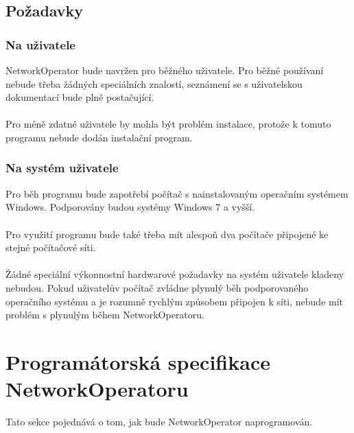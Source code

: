 \documentclass[12pt]{article}
\begin{document}
\subsection{Požadavky}
\subsubsection{Na uživatele}
NetworkOperator bude navržen pro běžného uživatele. Pro běžné používaní nebude třeba žádných speciálních znalostí, seznámení se s uživatelskou dokumentací bude plně postačující.\\\\
Pro méně zdatné uživatele by mohla být problém instalace, protože k tomuto programu nebude dodán instalační program.
\subsubsection{Na systém uživatele}
Pro běh programu bude zapotřebí počítač s nainstalovaným operačním systémem Windows. Podporovány budou systémy Windows 7 a vyšší.\\\\
Pro využití programu bude také třeba mít alespoň dva počítače připojené ke stejné počítačové síti.\\\\
Žádné speciální výkonnostní hardwarové požadavky na systém uživatele kladeny nebudou. Pokud uživatelův počítač zvládne plynulý běh podporovaného operačního systému a je rozumně rychlým způsobem připojen k síti, nebude mít problém s plynulým během NetworkOperatoru.

\section{Programátorská specifikace NetworkOperatoru}
Tato sekce pojednává o tom, jak bude NetworkOperator naprogramován.
\end{document}

